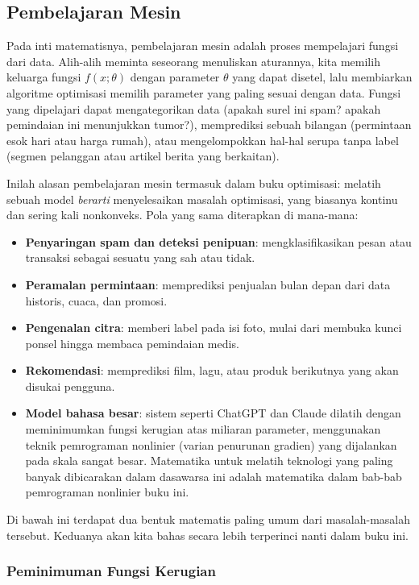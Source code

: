 \subsection{Pembelajaran Mesin}

Pada inti matematisnya, pembelajaran mesin adalah proses mempelajari fungsi dari data. Alih-alih meminta seseorang menuliskan aturannya, kita memilih keluarga fungsi $f(x;\theta)$ dengan parameter $\theta$ yang dapat disetel, lalu membiarkan algoritme optimisasi memilih parameter yang paling sesuai dengan data. Fungsi yang dipelajari dapat mengategorikan data (apakah surel ini spam? apakah pemindaian ini menunjukkan tumor?), memprediksi sebuah bilangan (permintaan esok hari atau harga rumah), atau mengelompokkan hal-hal serupa tanpa label (segmen pelanggan atau artikel berita yang berkaitan).

Inilah alasan pembelajaran mesin termasuk dalam buku optimisasi: melatih sebuah model \emph{berarti} menyelesaikan masalah optimisasi, yang biasanya kontinu dan sering kali nonkonveks. Pola yang sama diterapkan di mana-mana:
\begin{itemize}
\item \textbf{Penyaringan spam dan deteksi penipuan}: mengklasifikasikan pesan atau transaksi sebagai sesuatu yang sah atau tidak.
\item \textbf{Peramalan permintaan}: memprediksi penjualan bulan depan dari data historis, cuaca, dan promosi.
\item \textbf{Pengenalan citra}: memberi label pada isi foto, mulai dari membuka kunci ponsel hingga membaca pemindaian medis.
\item \textbf{Rekomendasi}: memprediksi film, lagu, atau produk berikutnya yang akan disukai pengguna.
\item \textbf{Model bahasa besar}: sistem seperti ChatGPT dan Claude dilatih dengan meminimumkan fungsi kerugian atas miliaran parameter, menggunakan teknik pemrograman nonlinier (varian penurunan gradien) yang dijalankan pada skala sangat besar. Matematika untuk melatih teknologi yang paling banyak dibicarakan dalam dasawarsa ini adalah matematika dalam bab-bab pemrograman nonlinier buku ini.
\end{itemize}
Di bawah ini terdapat dua bentuk matematis paling umum dari masalah-masalah tersebut. Keduanya akan kita bahas secara lebih terperinci nanti dalam buku ini.

\subsubsection*{Peminimuman Fungsi Kerugian}

